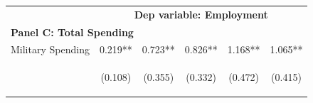 \documentclass[dv_diss_main.tex]{subfiles}
\begin{document}
\begin{table}[H]
\begin{center}
{\begin{tabular}{lccccc}
    & \multicolumn{5}{c}{\textbf{Dep variable: Employment}} \\
    \cmidrule{2-6}
    \multicolumn{6}{l}{\textbf{Panel C: Total Spending}} \\ 
     Military Spending & 0.219** & 0.723** & 0.826** & 1.168** & 1.065** \\
     & \begin{footnotesize}(0.108)\end{footnotesize} & \begin{footnotesize}(0.355)\end{footnotesize} & \begin{footnotesize}(0.332)\end{footnotesize} & \begin{footnotesize}(0.472)\end{footnotesize} & \begin{footnotesize}(0.415)\end{footnotesize} \\
    

\end{tabular}}
\end{center}
\end{table}
\end{document}
